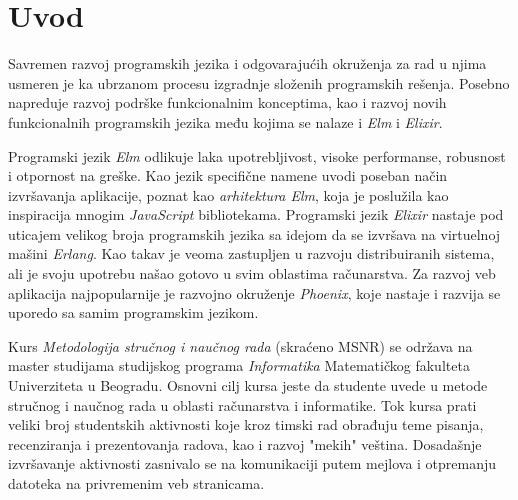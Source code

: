 \documentclass[12pt,oneside]{memoir}
\begin{document}
\frontmatter
\naslovna
\komisija
\apstrakt
\tableofcontents*

\mainmatter

\chapter{Uvod}
Savremen razvoj programskih jezika i odgovarajućih okruženja za rad u njima
usmeren je ka ubrzanom procesu izgradnje složenih programskih rešenja. Posebno
napreduje razvoj podrške funkcionalnim konceptima, kao i razvoj novih funkcionalnih
programskih jezika među kojima se nalaze i \emph{Elm} i \emph{Elixir}. 

Programski jezik \emph{Elm} odlikuje laka upotrebljivost, visoke performanse,
robusnost i otpornost na greške. Kao jezik specifične namene uvodi poseban
način izvršavanja aplikacije, poznat kao \emph{arhitektura Elm}, koja je
poslužila kao inspiracija mnogim \emph{JavaScript} bibliotekama.
Programski jezik \emph{Elixir} nastaje pod
uticajem velikog broja programskih jezika sa idejom da se izvršava na virtuelnoj
mašini \emph{Erlang}. Kao takav je veoma zastupljen u razvoju distribuiranih sistema,
ali je svoju upotrebu našao gotovo u svim oblastima računarstva.
Za razvoj veb aplikacija najpopularnije je razvojno okruženje \emph{Phoenix}, koje
nastaje i razvija se uporedo sa samim programskim jezikom.

Kurs \emph{Metodologija stručnog i naučnog rada} (skraćeno MSNR) se održava na master studijama
studijskog programa \emph{Informatika} Matematičkog fakulteta Univerziteta u Beogradu.
Osnovni cilj kursa jeste da studente uvede u metode stručnog i naučnog rada u oblasti računarstva
i informatike. Tok kursa prati veliki broj studentskih aktivnosti koje kroz timski rad
obrađuju teme pisanja, recenziranja i prezentovanja radova, kao i razvoj "mekih" veština.
Dosadašnje izvršavanje aktivnosti zasnivalo se na komunikaciji putem mejlova i otpremanju datoteka na
privremenim veb stranicama.
\end{document}
